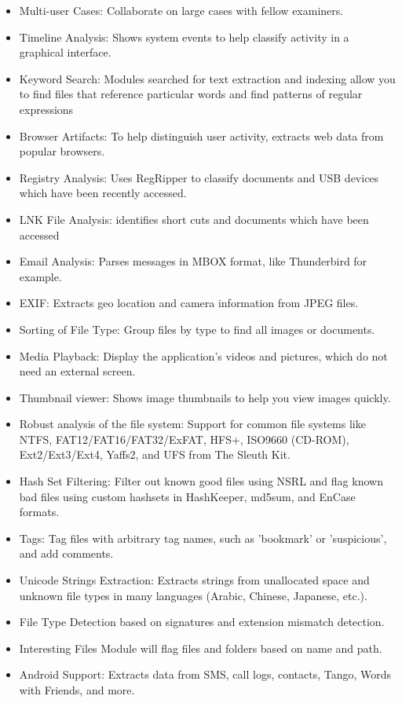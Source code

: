 \documentclass{easychair}
\begin{document}
\begin{itemize}
	\item Multi-user Cases: Collaborate on large cases with fellow examiners. 
\item Timeline Analysis: Shows system events to help classify activity in a graphical interface. 
\item Keyword Search: Modules searched for text extraction and indexing allow you to find files that reference particular words and find patterns of regular expressions
\item Browser Artifacts: To help distinguish user activity, extracts web data from popular browsers. 
\item Registry Analysis: Uses RegRipper to classify documents and USB devices which have been recently accessed. 
\item LNK File Analysis: identifies short cuts and documents which have been accessed 
\item Email Analysis: Parses messages in MBOX format, like Thunderbird for example.
\item EXIF: Extracts geo location and camera information from JPEG files. 
\item Sorting of File Type: Group files by type to find all images or documents. 
\item Media Playback: Display the application's videos and pictures, which do not need an external screen. 
\item Thumbnail viewer: Shows image thumbnails to help you view images quickly. 
\item Robust analysis of the file system: Support for common file systems like NTFS, FAT12/FAT16/FAT32/ExFAT, HFS+, ISO9660 (CD-ROM), Ext2/Ext3/Ext4, Yaffs2, and UFS from The Sleuth Kit.
\item Hash Set Filtering: Filter out known good files using NSRL and flag known bad files using custom hashsets in HashKeeper, md5sum, and EnCase formats. 
\item Tags: Tag files with arbitrary tag names, such as 'bookmark' or 'suspicious', and add comments.
\item Unicode Strings Extraction: Extracts strings from unallocated space and unknown file types in many languages (Arabic, Chinese, Japanese, etc.).
\item File Type Detection based on signatures and extension mismatch detection.
\item Interesting Files Module will flag files and folders based on name and path.
\item Android Support: Extracts data from SMS, call logs, contacts, Tango, Words with Friends, and more. 
\end{itemize}
\end{document}
